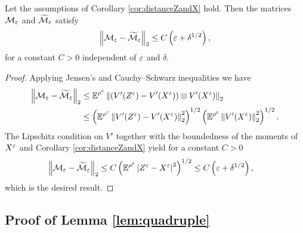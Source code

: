 \documentclass[10pt]{article}
\begin{document}
\begin{appendices}
\begin{lemma}\label{lem:distanceMandTildeM} Let the assumptions of Corollary \ref{cor:distanceZandX} hold. Then the matrices $\mathcal M_\varepsilon$ and $\widetilde{\mathcal M}_\varepsilon$ satisfy
	\begin{equation}
	\left\|\mathcal M_\varepsilon - \widetilde{\mathcal M}_\varepsilon\right\|_2 \leq C\left(\varepsilon + \delta^{1/2}\right),
	\end{equation}
	for a constant $C > 0$ independent of $\varepsilon$ and $\delta$.
\end{lemma}
\begin{proof} Applying Jensen's and Cauchy--Schwarz inequalities we have
	\begin{equation}
	\begin{aligned}
	\left\|\mathcal M_\varepsilon - \widetilde{\mathcal M}_\varepsilon\right\|_2 &\leq \operatorname{\mathbb{E}}^{\rho^\varepsilon} \left\|\left(V'(Z^\varepsilon) - V'(X^\varepsilon)\right) \otimes V'(X^\varepsilon)\right\|_2 \\
	&\leq \left(\operatorname{\mathbb{E}}^{\rho^\varepsilon}\left\|V'(Z^\varepsilon) - V'(X^\varepsilon)\right\|_2^2\right)^{1/2} \left(\operatorname{\mathbb{E}}^{\rho^\varepsilon} \left\|V'(X^\varepsilon)\right\|_2^{2}\right)^{1/2}.
	\end{aligned}
	\end{equation}
	The Lipschitz condition on $V'$ together with the boundedness of the moments of $X^\varepsilon$ and Corollary \ref{cor:distanceZandX} yield for a constant $C > 0$
	\begin{equation}
	\begin{aligned}
	\left\|\mathcal M_\varepsilon - \widetilde{\mathcal M}_\varepsilon\right\|_2 &\leq C\left(\operatorname{\mathbb{E}}^{\rho^\varepsilon}\left\lvert Z^\varepsilon - X^\varepsilon\right\rvert^{2}\right)^{1/2} \leq C \left(\varepsilon + \delta^{1/2} \right),
	\end{aligned}
	\end{equation}
	which is the desired result.
\end{proof}

\subsection{Proof of Lemma \ref{lem:quadruple}}


\end{appendices}
\end{document}
